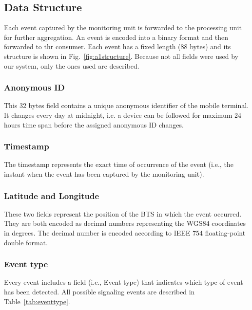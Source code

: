 \subsection{Data Structure}
\label{sec:dataa1}
Each event captured by the monitoring unit is forwarded to the processing unit for further aggregation. An event is encoded into a binary format and then forwarded to thr consumer. Each event has a fixed length (88 bytes) and its structure is shown in Fig.~\ref{fig:a1structure}.
Because not all fields were used by our system, only the ones used are described.

\subsubsection{Anonymous ID}
\label{sec:anonymous}
This 32 bytes field contains a unique anonymous identifier of the mobile terminal. It changes every day at midnight, i.e. a device can be followed for maximum 24 hours time span before the assigned anonymous ID changes.
\subsubsection{Timestamp} The timestamp represents the exact time of occurrence of the event (i.e., the instant when the event has been captured by the monitoring unit).
\subsubsection{Latitude and Longitude}
These two fields represent the position of the BTS in which the event occurred. They are both encoded as decimal numbers representing the WGS84 coordinates in degrees. The decimal number is encoded according to IEEE 754 floating-point double format\cite{IEEE754}.

\subsubsection{Event type}
Every event includes a field (i.e., Event type) that indicates which type of event
has been detected. All possible signaling events are described in Table~\ref{tab:eventtype}.
